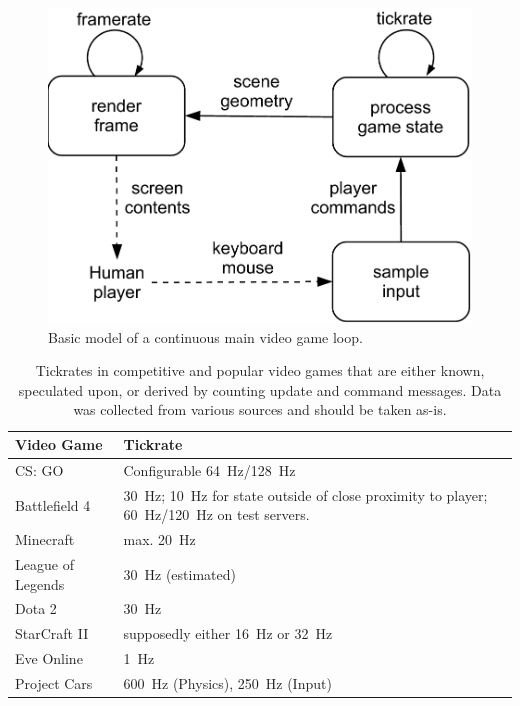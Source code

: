 \begin{figure}[!t]
	\centering
	\includegraphics[width=0.8\columnwidth]{../../../models/game_loop.pdf}
	\caption{Basic model of a continuous main video game loop.}
	\label{fig:gameloop1}
\end{figure}

\begin{table}[!t]
\caption{Tickrates in competitive and popular video games that are either known, speculated upon, or derived by counting update and command messages. Data was collected from various sources and should be taken as-is.}
\label{tbl:tickrates}
	\centering
	\begin{tabu}{X[0.45]X}
		\toprule
		\textbf{Video Game} & \textbf{Tickrate} \\
		\midrule
		CS: GO & Configurable \SI{64}{\hertz}/\SI{128}{\hertz} \\
		Battlefield 4 & \SI{30}{\hertz}; \SI{10}{\hertz} for state outside of close proximity to player; \SI{60}{\hertz}/\SI{120}{\hertz} on test servers. \\
		Minecraft & max. \SI{20}{\hertz} \\
		League of Legends & \SI{30}{\hertz} (estimated) \\
		Dota 2 & \SI{30}{\hertz} \\
		StarCraft II & supposedly either \SI{16}{\hertz} or \SI{32}{\hertz} \\
		Eve Online & \SI{1}{\hertz} \\
		Project Cars & \SI{600}{\hertz} (Physics), \SI{250}{\hertz} (Input) \\ %
		\bottomrule
	\end{tabu}
\end{table}

